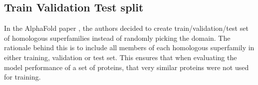     
    
    
    
\subsection{Train Validation Test split}
    
In the AlphaFold paper \cite{alphafold}, the authors decided to create train/validation/test set of homologous superfamilies instead of randomly picking the domain. 
The rationale behind this is to include all members of each homologous superfamily in either training, validation or test set. 
This ensures that when evaluating the model performance of a set of proteins, that very similar proteins were not used for training. 
    
